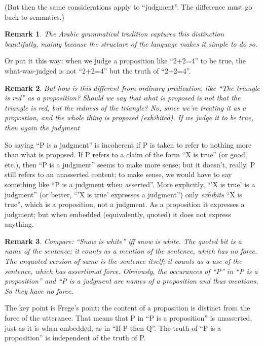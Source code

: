 \documentclass[12pt,toc]{tufte-handout}
\newtheorem{remark}{Remark}
\begin{document}
(But then the same considerations apply to ``judgment''.  The
difference must go back to semantics.)

\begin{remark}
  The Arabic grammatical tradition captures this distinction
  beautifully, mainly because the structure of the language makes it
  simple to do so.
\end{remark}

Or put it this way: when we judge a proposition like ``2+2=4'' to be
true, the what-was-judged is not ``2+2=4'' but the truth of ``2+2=4''.

\begin{remark}
  But how is this different from ordinary predication, like ``The
  triangle is red'' as a proposition?  Should we say that what is
  proposed is not that the triangle is red, but the redness of the
  triangle?  No, since we're treating it as a propostion, and the
  whole thing is proposed (exhibited).  If we judge it to be true,
  then again the judgment 
\end{remark}

So saying ``P is a judgment'' is incoherent if P is taken to refer to
nothing more than what is proposed.  If P refers to a claim of the
form ``X is true'' (or good, etc.), then ``P is a judgment'' seems to
make more sense; but it doesn't, really.  P still refers to an
unasserted content; to make sense, we would have to say something like
``P is a judgment when asserted''.  More explicitly, ``'X is true' is
a judgment'' (or better, ``'X is true' expresses a judgment'') only
\textit{exhibits} ``X is true'', which is a proposition, not a
judgment.  As a proposition it expresses a judgment; but when embedded
(equivalently, quoted) it does not express anything.

\begin{remark}
  Compare: ``Snow is white'' iff snow is white.  The quoted bit is a
  name of the sentence; it counts as a \textit{mention} of the
  sentence, which has no force.  The unquoted version of same is the
  sentence itself; it counts as a \textit{use} of the sentence, which
  has assertional force.  Obviously, the occurances of ``P'' in ``P is
  a proposition'' and ``P is a judgment are names of a proposition and
  thus mentions.  So they have no force.
\end{remark}

The key point is Frege's point: the content of a proposition is
distinct from the force of the utterance.  That means that P in ``P is
a proposition'' is unasserted, just as it is when embedded, as in ``If
P then Q''.  The truth of ``P is a proposition'' is independent of the
truth of P.
\end{document}
